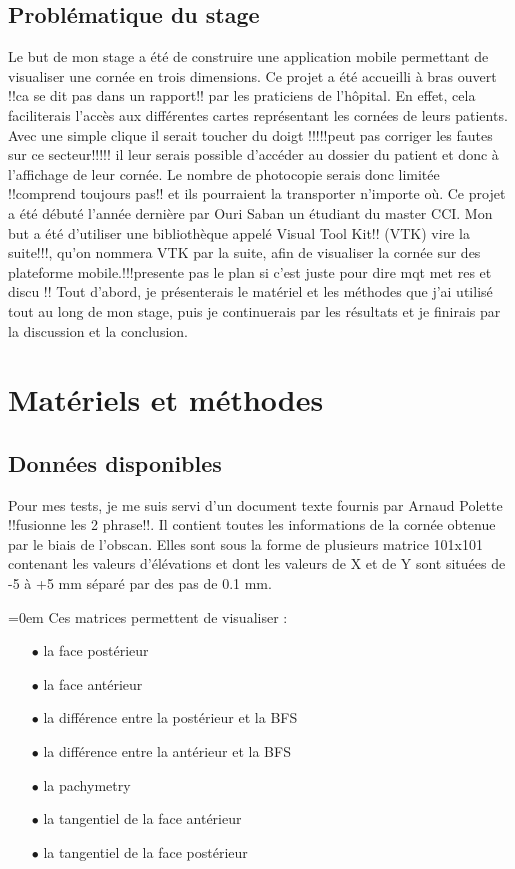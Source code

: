 \documentclass[a4paper,12pt]{article}
\begin{document}
	\subsection{Problématique du stage}
Le but de mon stage a été de construire une application mobile permettant de visualiser une cornée en trois dimensions. Ce projet a été accueilli à bras ouvert !!ca se dit pas dans un rapport!! par les praticiens de l'hôpital. En effet, cela faciliterais l'accès aux différentes cartes représentant les cornées de leurs patients. Avec une simple clique il serait toucher du doigt !!!!!peut pas corriger les fautes sur ce secteur!!!!! il leur serais possible d'accéder au dossier du patient et donc à l'affichage de leur cornée. Le nombre de photocopie serais donc limitée !!comprend toujours pas!! et ils pourraient la transporter n'importe où. Ce projet a été débuté l'année dernière par Ouri Saban un étudiant du master CCI. Mon but a été d'utiliser une bibliothèque appelé Visual Tool Kit!! (VTK) vire la suite!!!, qu'on nommera VTK par la suite, afin de visualiser la cornée sur des plateforme mobile.!!!presente pas le plan si c'est juste pour dire mqt met res et discu !! Tout d'abord, je présenterais le matériel et les méthodes que j'ai utilisé tout au long de mon stage, puis je continuerais par les résultats et je finirais par la discussion et la conclusion.

\newpage
\section{Matériels et méthodes}
	\subsection{Données disponibles}
Pour mes tests, je me suis servi d'un document texte fournis par Arnaud Polette !!fusionne les 2 phrase!!. Il contient toutes les informations de la cornée obtenue par le biais de l'obscan. Elles sont sous la forme de plusieurs matrice 101x101 contenant les valeurs d'élévations et dont les valeurs de X et de Y sont situées de -5 à +5 mm séparé par des pas de 0.1 mm.

\vspace{0.25cm}
\parindent=0em Ces matrices permettent de visualiser : %
\begin{itemize}\setlength{\itemsep}{1mm}
	\item[$\bullet$] la face postérieur 
	\item[$\bullet$] la face antérieur
	\item[$\bullet$] la différence entre la postérieur et la BFS
	\item[$\bullet$] la différence entre la antérieur et la BFS
	\item[$\bullet$] la pachymetry
	\item[$\bullet$] la tangentiel de la face antérieur
	\item[$\bullet$] la tangentiel de la face postérieur
\end{itemize}
\end{document}
